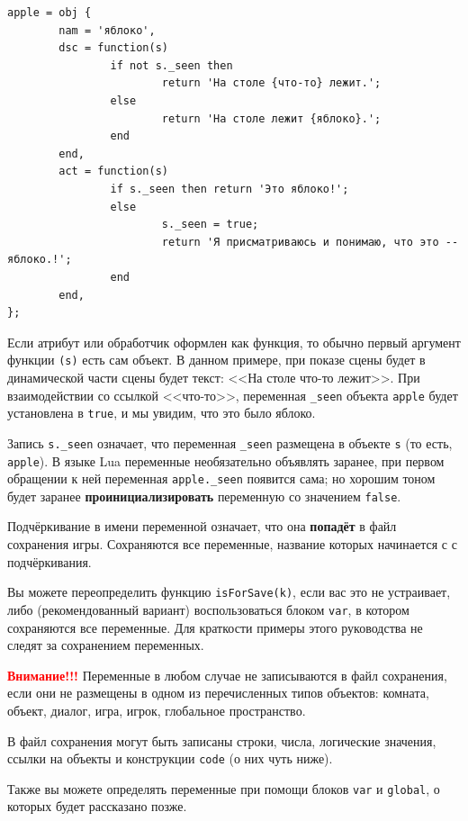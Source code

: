 \documentclass[12pt]{article}
\begin{document}
\begin{verbatim}
apple = obj {
        nam = 'яблоко',
        dsc = function(s)
                if not s._seen then
                        return 'На столе {что-то} лежит.';
                else
                        return 'На столе лежит {яблоко}.';
                end
        end,
        act = function(s)
                if s._seen then return 'Это яблоко!';
                else
                        s._seen = true;
                        return 'Я присматриваюсь и понимаю, что это -- яблоко.!';
                end
        end,
};
\end{verbatim}

Если атрибут или обработчик оформлен как функция, то обычно первый аргумент функции \verb/(s)/ есть сам объект. В данном примере, при показе сцены будет в динамической части сцены будет текст: <<На столе что-то лежит>>. При взаимодействии со ссылкой <<что-то>>, переменная \verb/_seen/ объекта \verb/apple/ будет установлена в \verb/true/, и мы увидим, что это было яблоко.

Запись \verb/s._seen/ означает, что переменная \verb/_seen/ размещена в объекте \verb/s/ (то есть, \verb/apple/). В языке Lua переменные необязательно объявлять заранее, при первом обращении к ней переменная \verb/apple._seen/ появится сама; но хорошим тоном будет заранее \textbf{проинициализировать} переменную со значением \verb/false/.

Подчёркивание в имени переменной означает, что она \textbf{попадёт} в файл сохранения игры. Сохраняются все переменные, название которых начинается с с подчёркивания.

Вы можете переопределить функцию \verb/isForSave(k)/, если вас это не устраивает, либо (рекомендованный вариант) воспользоваться блоком \verb/var/, в котором сохраняются все переменные. Для краткости примеры этого руководства не следят за сохранением переменных.

\textbf{\textcolor{red}{Внимание!!!}} Переменные в любом случае не записываются в файл сохранения, если они не размещены в одном из перечисленных типов объектов: комната, объект, диалог, игра, игрок, глобальное пространство.

В файл сохранения могут быть записаны строки, числа, логические значения, ссылки на объекты и конструкции \verb/code/ (о них чуть ниже).

Также вы можете определять переменные при помощи блоков \verb/var/ и \verb/global/, о которых будет рассказано позже.
\end{document}

